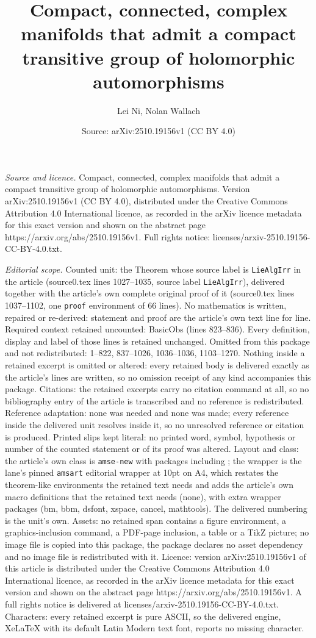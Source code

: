 \documentclass[10pt,a4paper]{amsart}
\title[Compact, connected, complex manifolds that admit a compact t]{Compact, connected, complex manifolds that admit a compact transitive group of holomorphic automorphisms}
\author{Lei Ni, Nolan Wallach}
\date{Source: arXiv:2510.19156v1 (CC BY 4.0)}
\begin{document}
\maketitle

\noindent\emph{Source and licence.} Compact, connected, complex manifolds that admit a compact transitive group of holomorphic automorphisms. Version arXiv:2510.19156v1 (CC BY 4.0), distributed under the Creative Commons Attribution 4.0 International licence, as recorded in the arXiv licence metadata for this exact version and shown on the abstract page https://arxiv.org/abs/2510.19156v1. Full rights notice: licenses/arxiv-2510.19156-CC-BY-4.0.txt.\par\smallskip

\noindent\textit{Editorial scope.} Counted unit: the Theorem whose source label is \texttt{LieAlgIrr} in the article (source0.tex lines 1027--1035, source label \texttt{LieAlgIrr}), delivered together with the article's own complete original proof of it (source0.tex lines 1037--1102, one \texttt{proof} environment of 66 lines). No mathematics is written, repaired or re-derived: statement and proof are the article's own text line for line. Required context retained uncounted: BasicObs (lines 823--836). Every definition, display and label of those lines is retained unchanged. Omitted from this package and not redistributed: 1--822, 837--1026, 1036--1036, 1103--1270. Nothing inside a retained excerpt is omitted or altered: every retained body is delivered exactly as the article's lines are written, so no omission receipt of any kind accompanies this package. Citations: the retained excerpts carry no citation command at all, so no bibliography entry of the article is transcribed and no reference is redistributed. Reference adaptation: none was needed and none was made; every reference inside the delivered unit resolves inside it, so no unresolved reference or citation is produced. Printed slips kept literal: no printed word, symbol, hypothesis or number of the counted statement or of its proof was altered. Layout and class: the article's own class is \texttt{amse-new} with packages including ; the wrapper is the lane's pinned \texttt{amsart} editorial wrapper at 10pt on A4, which restates the theorem-like environments the retained text needs and adds the article's own macro definitions that the retained text needs (none), with extra wrapper packages (bm, bbm, dsfont, xspace, cancel, mathtools). The delivered numbering is the unit's own. Assets: no retained span contains a figure environment, a graphics-inclusion command, a PDF-page inclusion, a table or a TikZ picture; no image file is copied into this package, the package declares no asset dependency and no image file is redistributed with it. Licence: version arXiv:2510.19156v1 of this article is distributed under the Creative Commons Attribution 4.0 International licence, as recorded in the arXiv licence metadata for this exact version and shown on the abstract page https://arxiv.org/abs/2510.19156v1. A full rights notice is delivered at licenses/arxiv-2510.19156-CC-BY-4.0.txt. Characters: every retained excerpt is pure ASCII, so the delivered engine, XeLaTeX with its default Latin Modern text font, reports no missing character.
\end{document}
